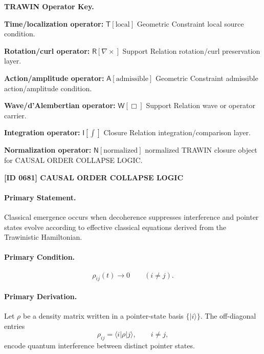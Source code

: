 \par\vspace{0.45\baselineskip}
\noindent\begin{minipage}[t]{\linewidth}
\begingroup
\small
\raggedright
\textbf{TRAWIN Operator Key.}\par
\noindent\textbf{Time/localization operator:} $\mathsf{T}\!\left[\mathrm{local}\right]$ Geometric Constraint local source condition.\par
\noindent\textbf{Rotation/curl operator:} $\mathsf{R}\!\left[\nabla\times\right]$ Support Relation rotation/curl preservation layer.\par
\noindent\textbf{Action/amplitude operator:} $\mathsf{A}\!\left[\mathrm{admissible}\right]$ Geometric Constraint admissible action/amplitude condition.\par
\noindent\textbf{Wave/d'Alembertian operator:} $\mathsf{W}\!\left[\Box\right]$ Support Relation wave or operator carrier.\par
\noindent\textbf{Integration operator:} $\mathsf{I}\!\left[\int\right]$ Closure Relation integration/comparison layer.\par
\noindent\textbf{Normalization operator:} $\mathsf{N}\!\left[\mathrm{normalized}\right]$ normalized TRAWIN closure object for CAUSAL ORDER COLLAPSE LOGIC.\par
\endgroup
\end{minipage}

\clearpage
\noindent\textbf{[ID 0681] CAUSAL ORDER COLLAPSE LOGIC}\par
\vspace{0.35em}
\paragraph{Primary Statement.}
Classical emergence occurs when decoherence suppresses interference and pointer states evolve according to effective classical equations derived from the Trawinistic Hamiltonian.

\paragraph{Primary Condition.}
\begin{equation}
\rho_{ij}(t)\rightarrow 0
\qquad
(i\neq j).
\end{equation}

\paragraph{Primary Derivation.}
Let $\rho$ be a density matrix written in a pointer-state basis $\{|i\rangle\}$.  
The off-diagonal entries
\begin{equation}
\rho_{ij}
=
\langle i|\rho|j\rangle,
\qquad i\neq j,
\end{equation}
encode quantum interference between distinct pointer states.

